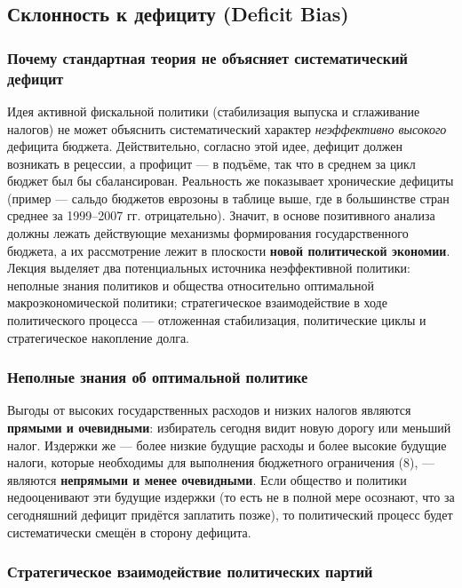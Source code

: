 \documentclass[11pt,a4paper]{article}
\begin{document}
\subsection{Склонность к дефициту (Deficit Bias)}

\subsubsection{Почему стандартная теория не объясняет систематический дефицит}

Идея активной фискальной политики (стабилизация выпуска и сглаживание налогов) не может объяснить систематический характер \emph{неэффективно высокого} дефицита бюджета. Действительно, согласно этой идее, дефицит должен возникать в рецессии, а профицит --- в подъёме, так что в среднем за цикл бюджет был бы сбалансирован. Реальность же показывает хронические дефициты (пример --- сальдо бюджетов еврозоны в таблице выше, где в большинстве стран среднее за 1999--2007 гг. отрицательно). Значит, в основе позитивного анализа должны лежать действующие механизмы формирования государственного бюджета, а их рассмотрение лежит в плоскости \textbf{новой политической экономии}. Лекция выделяет два потенциальных источника неэффективной политики: неполные знания политиков и общества относительно оптимальной макроэкономической политики; стратегическое взаимодействие в ходе политического процесса --- отложенная стабилизация, политические циклы и стратегическое накопление долга.

\subsubsection{Неполные знания об оптимальной политике}

Выгоды от высоких государственных расходов и низких налогов являются \textbf{прямыми и очевидными}: избиратель сегодня видит новую дорогу или меньший налог. Издержки же --- более низкие будущие расходы и более высокие будущие налоги, которые необходимы для выполнения бюджетного ограничения (8), --- являются \textbf{непрямыми и менее очевидными}. Если общество и политики недооценивают эти будущие издержки (то есть не в полной мере осознают, что за сегодняшний дефицит придётся заплатить позже), то политический процесс будет систематически смещён в сторону дефицита.

\subsubsection{Стратегическое взаимодействие политических партий}
\end{document}
